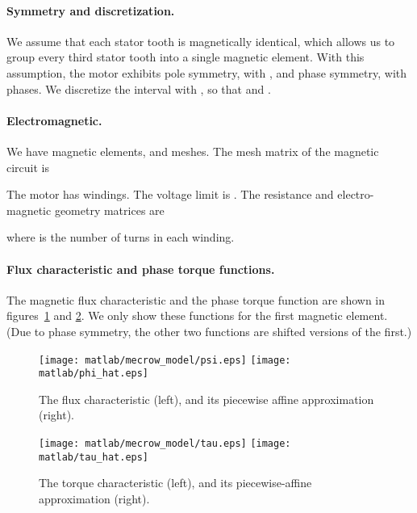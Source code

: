 \documentclass[11pt]{article}
\newif\ifarxiv
\begin{document}
\paragraph{Symmetry and discretization.}
We assume that each stator tooth is magnetically identical,
which allows us to group every third stator tooth into a single magnetic element.
With this assumption,
the motor exhibits pole symmetry, with ,
and phase symmetry, with  phases.
We discretize the interval  with ,
so that  and .

\paragraph{Electromagnetic.}
We have  magnetic elements, and  meshes.
The mesh matrix of the magnetic circuit is

The motor has  windings.
The voltage limit is .
The resistance and electro-magnetic geometry matrices are

where  is the number of turns in each winding.






\paragraph{Flux characteristic and phase torque functions.}
The magnetic flux characteristic  and the phase torque function  
are shown in figures~\ref{f-flux-characteristic}
and \ref{f-torque-function}.
We only show these functions for the first magnetic element.
(Due to phase symmetry,
the other two functions are shifted versions of the first.)

\begin{figure} 
\begin{center}
\ifarxiv
\texttt{[image: psi.eps]}
\texttt{[image: phi\_hat.eps]}
\else
\texttt{[image: matlab/mecrow\_model/psi.eps]}
\texttt{[image: matlab/phi\_hat.eps]}
\fi
\caption{
The flux characteristic  (left),
and its piecewise affine approximation  (right).
}
\label{f-flux-characteristic}
\end{center}
\end{figure}

\begin{figure} 
\begin{center}
\ifarxiv
\texttt{[image: tau.eps]}
\texttt{[image: tau\_hat.eps]}
\else
\texttt{[image: matlab/mecrow\_model/tau.eps]}
\texttt{[image: matlab/tau\_hat.eps]}
\fi
\caption{
The torque characteristic  (left),
and its piecewise-affine approximation  (right).
}
\label{f-torque-function}
\end{center}
\end{figure}
\end{document}
